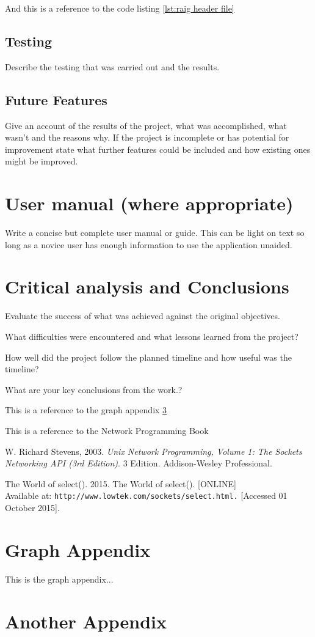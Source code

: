 \documentclass[12pt,a4paper,titlepage]{article}
\begin{document}
And this is a reference to the code listing \ref{lst:raig header file}
\subsection{Testing}

Describe the testing that was carried out and the results.

\subsection{Future Features}

Give an account of the results of the project, what was accomplished, what wasn't and the reasons why. If the project is incomplete or has potential for improvement state what further features could be included and how existing ones might be improved.

\section{User manual (where appropriate)}
Write a concise but complete user manual or guide. This can be light on text so long as a novice user has enough information to use the application unaided.

\section{Critical analysis and Conclusions}
Evaluate the success of what was achieved against the original objectives. 

What difficulties were encountered and what lessons learned from the project? 

How well did the project follow the planned timeline and how useful was the timeline?  

What are your key conclusions from the work.?

This is a reference to the graph appendix \ref{appendix:graph}

This is a reference to the Network Programming Book \cite[p.~215]{stevensunp}

\newpage
%
\begin{thebibliography}{9}

W. Richard Stevens, 2003. \textit{Unix Network Programming, Volume 1: The Sockets Networking API (3rd Edition)}. 3 Edition. Addison-Wesley Professional.

The World of select(). 2015. The World of select(). [ONLINE] \\
Available at: \texttt{http://www.lowtek.com/sockets/select.html.} [Accessed 01 October 2015].

\end{thebibliography}

\newpage
\begin{appendices}

\section{Graph Appendix}
\label{appendix:graph}
This is the graph appendix...

\section{Another Appendix}

\end{appendices}
\end{document}
